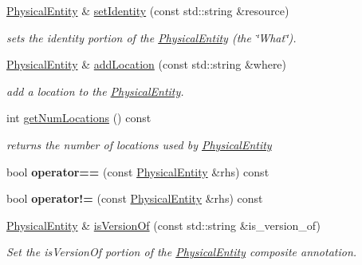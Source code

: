 \begin{DoxyCompactItemize}
\hyperlink{classomexmeta_1_1PhysicalEntity}{Physical\+Entity} \& \hyperlink{classomexmeta_1_1PhysicalEntity_a4d4c3ee9572b19e44e79a44f18f1ac31}{set\+Identity} (const std\+::string \&resource)
\begin{DoxyCompactList}\small\item\em sets the identity portion of the \hyperlink{classomexmeta_1_1PhysicalEntity}{Physical\+Entity} (the \char`\"{}\+What\char`\"{}). \end{DoxyCompactList}\item 
\hyperlink{classomexmeta_1_1PhysicalEntity}{Physical\+Entity} \& \hyperlink{classomexmeta_1_1PhysicalEntity_a82e77be3327c537b2426b571afaa5045}{add\+Location} (const std\+::string \&where)
\begin{DoxyCompactList}\small\item\em add a location to the \hyperlink{classomexmeta_1_1PhysicalEntity}{Physical\+Entity}. \end{DoxyCompactList}\item 
int \hyperlink{classomexmeta_1_1PhysicalEntity_a33559c90dbe3e3be1b71898ab9a5bfa4}{get\+Num\+Locations} () const
\begin{DoxyCompactList}\small\item\em returns the number of locations used by \hyperlink{classomexmeta_1_1PhysicalEntity}{Physical\+Entity} \end{DoxyCompactList}\item 
\mbox{\label{classomexmeta_1_1PhysicalEntity_a5f54e5c2df0fd5c3b9121e1426b23af6}} 
bool {\bfseries operator==} (const \hyperlink{classomexmeta_1_1PhysicalEntity}{Physical\+Entity} \&rhs) const
\item 
\mbox{\label{classomexmeta_1_1PhysicalEntity_afee546a420f16e128ed1add9fec35b4f}} 
bool {\bfseries operator!=} (const \hyperlink{classomexmeta_1_1PhysicalEntity}{Physical\+Entity} \&rhs) const
\item 
\hyperlink{classomexmeta_1_1PhysicalEntity}{Physical\+Entity} \& \hyperlink{classomexmeta_1_1PhysicalEntity_a5399ef8eef084f2dd8b13ef537823d94}{is\+Version\+Of} (const std\+::string \&is\+\_\+version\+\_\+of)
\begin{DoxyCompactList}\small\item\em Set the is\+Version\+Of portion of the \hyperlink{classomexmeta_1_1PhysicalEntity}{Physical\+Entity} composite annotation. \end{DoxyCompactList}\item 

\end{DoxyCompactItemize}
